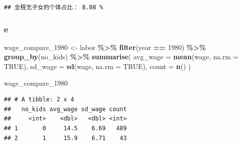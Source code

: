 \documentclass[
]{article}
\newenvironment{Shaded}{\begin{snugshade}}{\end{snugshade}}
\newcommand{\AttributeTok}[1]{\textcolor[rgb]{0.13,0.29,0.53}{#1}}
\newcommand{\ConstantTok}[1]{\textcolor[rgb]{0.56,0.35,0.01}{#1}}
\newcommand{\DecValTok}[1]{\textcolor[rgb]{0.00,0.00,0.81}{#1}}
\newcommand{\FunctionTok}[1]{\textcolor[rgb]{0.13,0.29,0.53}{\textbf{#1}}}
\newcommand{\NormalTok}[1]{#1}
\newcommand{\OtherTok}[1]{\textcolor[rgb]{0.56,0.35,0.01}{#1}}
\newcommand{\SpecialCharTok}[1]{\textcolor[rgb]{0.81,0.36,0.00}{\textbf{#1}}}
\begin{document}
\begin{verbatim}
## 全程无子女的个体占比： 8.08 %
\end{verbatim}

\subsubsection{e}\label{e-1}

\begin{Shaded}
\begin{Highlighting}[]
\NormalTok{wage\_compare\_1980 }\OtherTok{\textless{}{-}}\NormalTok{ labor }\SpecialCharTok{\%\textgreater{}\%}
  \FunctionTok{filter}\NormalTok{(year }\SpecialCharTok{==} \DecValTok{1980}\NormalTok{) }\SpecialCharTok{\%\textgreater{}\%}
  \FunctionTok{group\_by}\NormalTok{(no\_kids) }\SpecialCharTok{\%\textgreater{}\%}
  \FunctionTok{summarise}\NormalTok{(}
    \AttributeTok{avg\_wage =} \FunctionTok{mean}\NormalTok{(wage, }\AttributeTok{na.rm =} \ConstantTok{TRUE}\NormalTok{),   }
    \AttributeTok{sd\_wage =} \FunctionTok{sd}\NormalTok{(wage, }\AttributeTok{na.rm =} \ConstantTok{TRUE}\NormalTok{),      }
    \AttributeTok{count =} \FunctionTok{n}\NormalTok{()                            }
\NormalTok{  )}


\NormalTok{wage\_compare\_1980}
\end{Highlighting}
\end{Shaded}

\begin{verbatim}
## # A tibble: 2 x 4
##   no_kids avg_wage sd_wage count
##     <int>    <dbl>   <dbl> <int>
## 1       0     14.5    6.69   489
## 2       1     15.9    6.71    43
\end{verbatim}
\end{document}
